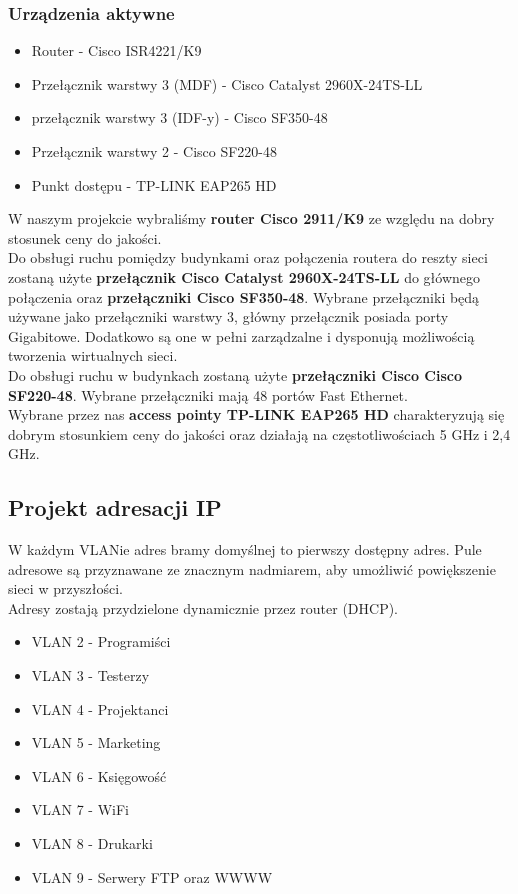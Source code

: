 \documentclass[a4paper,12pt]{extarticle}  %
\begin{document}
\subsubsection{Urządzenia aktywne}
\begin{itemize}
	\item Router - Cisco ISR4221/K9
	\item Przełącznik warstwy 3 (MDF) - Cisco Catalyst 2960X-24TS-LL
	\item przełącznik warstwy 3 (IDF-y) - Cisco SF350-48
	\item Przełącznik warstwy 2 - Cisco SF220-48
	\item Punkt dostępu - TP-LINK EAP265 HD
\end{itemize}
W naszym projekcie wybraliśmy \textbf{router Cisco 2911/K9} ze względu na dobry stosunek
ceny do jakości. \\

Do obsługi ruchu pomiędzy budynkami oraz połączenia routera do reszty sieci zostaną użyte
\textbf{przełącznik Cisco Catalyst 2960X-24TS-LL} do głównego połączenia oraz \textbf{przełączniki Cisco SF350-48}.
Wybrane przełączniki będą używane jako przełączniki warstwy 3, główny przełącznik posiada porty Gigabitowe.
Dodatkowo są one w pełni zarządzalne i dysponują możliwością tworzenia wirtualnych sieci.\\

Do obsługi ruchu w budynkach zostaną użyte \textbf{przełączniki Cisco Cisco SF220-48}.
Wybrane przełączniki mają 48 portów Fast Ethernet.\\

Wybrane przez nas \textbf{access pointy TP-LINK EAP265 HD} charakteryzują się dobrym stosunkiem ceny
do jakości oraz działają na częstotliwościach 5 GHz i 2,4 GHz.

\subsection{Projekt adresacji IP}
W każdym VLANie adres bramy domyślnej to pierwszy dostępny adres.
Pule adresowe są przyznawane ze znacznym nadmiarem, aby umożliwić powiększenie sieci w przyszłości.\\
Adresy zostają przydzielone dynamicznie przez router (DHCP).\\

\begin{itemize}
	\item VLAN 2 - Programiści
	\item VLAN 3 - Testerzy
	\item VLAN 4 - Projektanci
	\item VLAN 5 - Marketing
	\item VLAN 6 - Księgowość
	\item VLAN 7 - WiFi
	\item VLAN 8 - Drukarki
	\item VLAN 9 - Serwery FTP oraz WWWW
\end{itemize}
\end{document}
